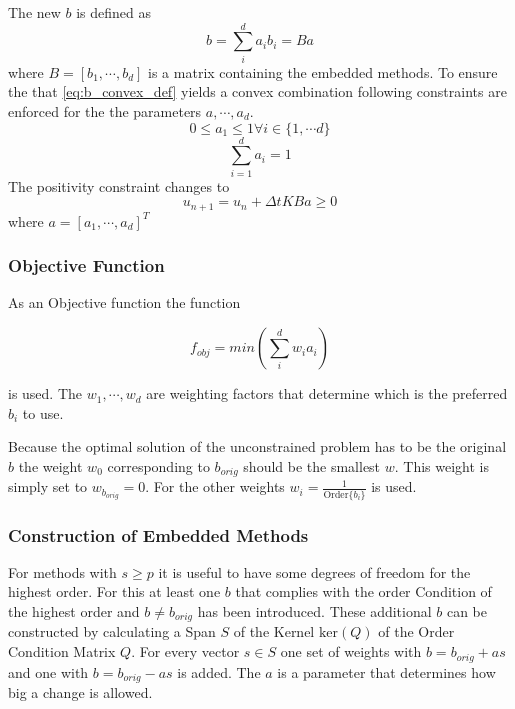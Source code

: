 \documentclass{article}
\begin{document}
The new $b$ is defined as 
\begin{equation}\label{eq:b_convex_def}
b = \sum_i^d a_i b_i = Ba
\end{equation}
where $B=\left[b_1,\cdots,b_d \right]$ is a matrix containing the embedded methods.  
To ensure the that \eqref{eq:b_convex_def} yields a convex combination following constraints are enforced for the  the parameters $a,\cdots,a_d$.
\begin{equation}
 0 \leq a_1 \leq 1  \forall {i \in \{1, \cdots d \}}
\end{equation}
\begin{equation}
 \sum_{i=1}^d a_i = 1
\end{equation}
The positivity constraint changes to 
$$u_{n+1}=u_n+\Delta t K B a \geq 0$$
where $a = [a_1,\cdots,a_d]^T$

\subsubsection{Objective Function}

As an Objective function the function

\begin{equation}
f_{obj} = min \left(\sum_i^d w_i a_i \right)
\end{equation}

is used.  The $w_1,\cdots,w_d$ are weighting factors that determine which is the preferred $b_i$ to use.

Because the optimal solution of the unconstrained problem has to be the original $b$ the weight $w_0$ corresponding to $b_{orig}$ should be the smallest $w$. This weight is simply set to $w_{b_{orig}} = 0$. For the other weights $w_i = \frac{1}{\mathrm{Order} \{b_i\}}$ is used.

\subsubsection{Construction of Embedded Methods}
For methods with $s \geq p$ it is useful to have some degrees of freedom for the highest order. For this at least one $b$ that complies with the order Condition of the highest order and $b \neq b_{orig}$ has been introduced.
These additional $b$ can be constructed by calculating a Span $S$ of the Kernel $\mathrm{ker} (Q)$ of the Order Condition Matrix $Q$. For every vector $s \in S$ one set of weights with $b = b_{orig} + a s$ and one with $b = b_{orig} - a s$ is added. The $a$ is a parameter that determines how big a change is allowed. 
\end{document}
